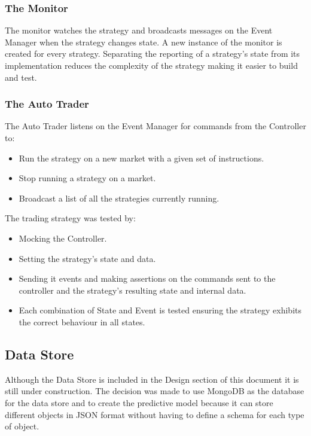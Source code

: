 	\subsubsection{The Monitor}
	The monitor watches the strategy and broadcasts messages on the Event Manager when the strategy changes state. A new instance of the monitor is created for every strategy. Separating the reporting of a strategy's state from its implementation reduces the complexity of the strategy making it easier to build and test.
	
	\subsubsection{The Auto Trader}
	The Auto Trader listens on the Event Manager for commands from the Controller to:
		\begin{itemize}
			\item Run the strategy on a new market with a given set of instructions.
			\item Stop running a strategy on a market.
			\item Broadcast a list of all the strategies currently running.
		\end{itemize}			
	
	The trading strategy was tested by:
		\begin{itemize}
			\item Mocking the Controller.
			\item Setting the strategy's state and data.
			\item Sending it events and making assertions on the commands sent to the controller and the strategy's resulting state and internal data.
			\item Each combination of State and Event is tested ensuring the strategy exhibits the correct behaviour in all states.
		\end{itemize}
	
	\subsection{Data Store}
	Although the Data Store is included in the Design section of this document it is still under construction. The decision was made to use MongoDB as the database for the data store and to create the predictive model because it can store different objects in JSON format without having to define a schema for each type of object.
	
	